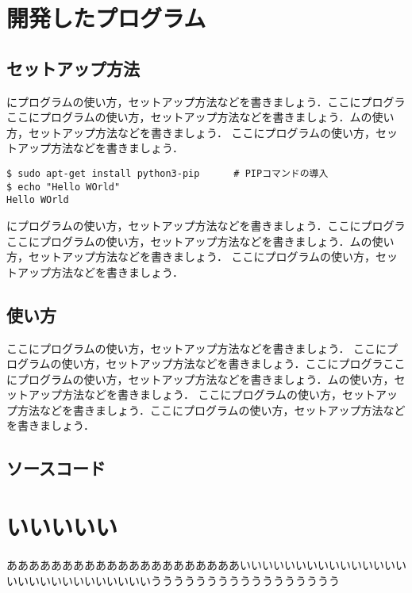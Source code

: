 

\appendix %
\chapter{開発したプログラム}
\section{セットアップ方法}


にプログラムの使い方，セットアップ方法などを書きましょう．ここにプログラここにプログラムの使い方，セットアップ方法などを書きましょう．ムの使い方，セットアップ方法などを書きましょう．
ここにプログラムの使い方，セットアップ方法などを書きましょう．

\begin{Verbatim}[frame=single]
$ sudo apt-get install python3-pip      # PIPコマンドの導入
$ echo "Hello WOrld"
Hello WOrld
\end{Verbatim}

にプログラムの使い方，セットアップ方法などを書きましょう．ここにプログラここにプログラムの使い方，セットアップ方法などを書きましょう．ムの使い方，セットアップ方法などを書きましょう．
ここにプログラムの使い方，セットアップ方法などを書きましょう．

\section{使い方}
ここにプログラムの使い方，セットアップ方法などを書きましょう．
ここにプログラムの使い方，セットアップ方法などを書きましょう．ここにプログラここにプログラムの使い方，セットアップ方法などを書きましょう．ムの使い方，セットアップ方法などを書きましょう．
ここにプログラムの使い方，セットアップ方法などを書きましょう．ここにプログラムの使い方，セットアップ方法などを書きましょう．

\section{ソースコード}
%




\chapter{いいいいい}
あああああああああああああああああああああいいいいいいいいいいいいいいいいいいいいいいいいいいいいううううううううううううううううう
